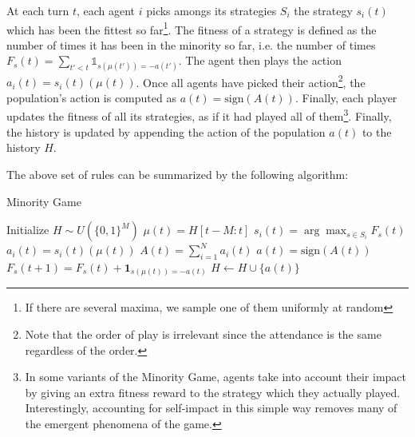 \documentclass[a4paper, amsfonts, amssymb, amsmath, reprint, showkeys, nofootinbib, twoside]{revtex4-1}
\begin{document}
At each turn $t$, each agent $i$ picks amongs its strategies $S_i$ the strategy $s_i(t)$ which has been the fittest so far\footnote{If there are several maxima, we sample one of them uniformly at random}. The fitness of a strategy is defined as the number of times it has been in the minority so far, i.e. the number of times $F_s(t) = \sum_{t' < t} \mathbb{1}_{s(\mu(t')) = -a(t')}$. The agent then plays the action $a_i(t) = s_i(t)(\mu(t))$. Once all agents have picked their action\footnote{Note that the order of play is irrelevant since the attendance is the same regardless of the order.}, the population's action is computed as $a(t) = \text{sign}(A(t))$. Finally, each player updates the fitness of all its strategies, as if it had played all of them\footnote{In some variants of the Minority Game, agents take into account their impact by giving an extra fitness reward to the strategy which they actually played. Interestingly, accounting for self-impact in this simple way removes many of the emergent phenomena of the game.}. Finally, the history is updated by appending the action of the population $a(t)$ to the history $H$.

The above set of rules can be summarized by the following algorithm:
\begin{algorithm}
    \caption{Minority Game}
    \label{alg:minority-game}
    \begin{algorithmic}[1]
        \State Initialize $H \sim U(\{0, 1\} ^M)$
            \State $\mu(t) = H[t-M:t]$
                \State $s_i(t) = \arg\max_{s \in S_i} F_s(t)$
                \State $a_i(t) = s_i(t)(\mu(t))$
            \EndFor
            \State $A(t) = \sum_{i=1}^N a_i(t)$
            \State $a(t) = \text{sign}(A(t))$
                    \State $F_s(t+1) = F_s(t) + \mathbf{1}_ {s(\mu(t)) = -a(t)}$
                \EndFor
            \EndFor
            \State $H \gets H \cup \{a(t)\}$
        \EndFor
    \end{algorithmic}
\end{algorithm}
\end{document}
